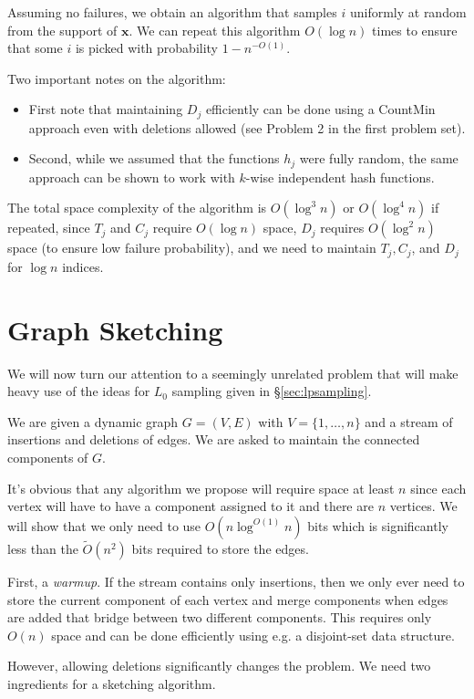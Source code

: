 \documentclass[11pt]{article}
\begin{document}
Assuming no failures, we obtain an algorithm that samples $i$ uniformly at random from the support of $\mathbf{x}$. We can repeat this algorithm $O(\log n)$ times to ensure that some $i$ is picked with probability $1 - n^{-O(1)}$.

Two important notes on the algorithm:
\begin{itemize}
\item First note that maintaining $D_j$ efficiently can be done using a CountMin approach even with deletions allowed (see Problem 2 in the first problem set).
\item Second, while we assumed that the functions $h_j$ were fully random, the same approach can be shown to work with $k$-wise independent hash functions.
\end{itemize}

The total space complexity of the algorithm is $O(\log^3 n)$ or $O(\log^4 n)$ if repeated, since $T_j$ and $C_j$ require $O(\log n)$ space, $D_j$ requires $O(\log^2 n)$ space (to ensure low failure probability), and we need to maintain $T_j, C_j$, and $D_j$ for $\log n$ indices.

\section{Graph Sketching}

We will now turn our attention to a seemingly unrelated problem that will make heavy use of the ideas for $L_0$ sampling given in \S\ref{sec:lpsampling}.

We are given a dynamic graph $G = (V, E)$ with $V = \{1, \ldots, n\}$ and a stream of insertions and deletions of edges. We are asked to maintain the connected components of $G$.

It's obvious that any algorithm we propose will require space at least $n$ since each vertex will have to have a component assigned to it and there are $n$ vertices. We will show that we only need to use $O(n \log^{O(1)} n)$ bits which is significantly less than the $\tilde{O}(n^2)$ bits required to store the edges.

First, a \emph{warmup}. If the stream contains only insertions, then we only ever need to store the current component of each vertex and merge components when edges are added that bridge between two different components. This requires only $O(n)$ space and can be done efficiently using e.g. a disjoint-set data structure.

However, allowing deletions significantly changes the problem. We need two ingredients for a sketching algorithm.
\end{document}
